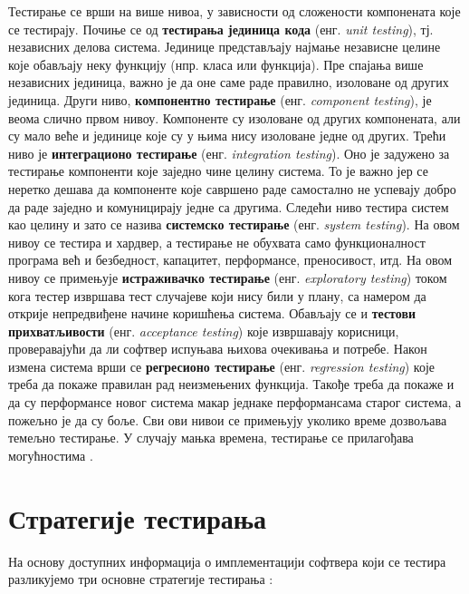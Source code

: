 \documentclass[12pt,oneside]{memoir}
\begin{document}
\par Тестирање се врши на више нивоа, у зависности од сложености компонената које се тестирају. Почиње се од \textbf{тестирања јединица кода} (енг. \textit{unit testing}), тј. независних делова система. Јединице представљају најмање независне целине које обављају неку функцију (нпр. класа или функција). Пре спајања више независних јединица, важно је да оне саме раде правилно, изоловане од других јединица. Други ниво, \textbf{компонентно тестирање} (енг. \textit{component testing}), је веома слично првом нивоу. Компоненте су изоловане од других компонената, али су мало веће и јединице које су у њима нису изоловане једне од других. Трећи ниво је \textbf{интеграционо тестирање} (енг. \textit{integration testing}). Оно је задужено за тестирање компоненти које заједно чине целину система. То је важно јер се неретко дешава да компоненте које савршено раде самостално не успевају добро да раде заједно и комуницирају једне са другима. Следећи ниво тестира систем као целину и зато се назива \textbf{системско тестирање} (енг. \textit{system testing}). На овом нивоу се тестира и хардвер, а тестирање не обухвата само функционалност програма већ и безбедност, капацитет, перформансе, преносивост, итд. На овом нивоу се примењује \textbf{истраживачко тестирање} (енг. \textit{exploratory testing}) током кога тестер извршава тест случајеве који нису били у плану, са намером да открије непредвиђене начине коришћења система. Обављају се и \textbf{тестови прихватљивости} (енг. \textit{acceptance testing}) које извршавају корисници, проверавајући да ли софтвер испуњава њихова очекивања и потребе. Након измена система врши се \textbf{регресионо тестирање} (енг. \textit{regression testing}) које треба да покаже правилан рад неизмењених  функција. Такође треба да покаже и да су перформансе новог система макар једнаке перформансама старог система, а пожељно је да су боље. Сви ови нивои се примењују уколико време дозвољава темељно тестирање. У случају мањка времена, тестирање се прилагођава могућностима \cite{guideTestDesign, testMilena}.

\section{Стратегије тестирања}
\label{sec:stratTest}

На основу доступних информација о имплементацији софтвера који се тестира разликујемо три основне стратегије тестирања \cite{fuzzingBrute, fuzzing, testMilena}: 
\end{document}
